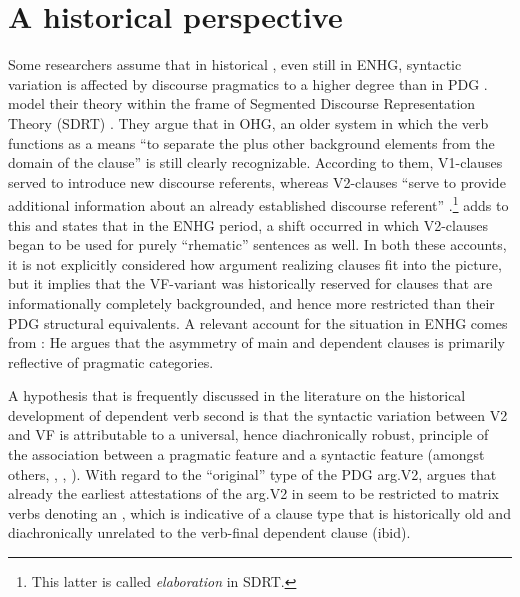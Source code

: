 \documentclass[output=paper,colorlinks,citecolor=brown]{langscibook}
\begin{document}
\section{A historical perspective}\label{sec:reetz:3}

Some researchers assume that in historical , even still in ENHG, syntactic variation is affected by discourse pragmatics to a higher degree than in PDG \citep{fleischmann1973,hinterholzl2010v1,speyer2010}. \citet{hinterholzl2010v1} model their theory within the frame of Segmented Discourse Representation Theory (SDRT) \citep{AsherLascarides2003}. They argue that in OHG, an older system in which the verb functions as a means “to separate the  plus other background elements from the  domain of the clause” \citep[5]{hinterholzl2010v1} is still clearly recognizable. According to them, V1-clauses served to introduce new discourse referents, whereas V2-clauses “serve to provide additional information about an already established discourse referent” \citep[2]{hinterholzl2010v1}.\footnote{This latter  is called \textit{elaboration} in SDRT.} \citet{speyer2010} adds to this and states that in the ENHG period, a shift occurred in which V2-clauses began to be used for purely “rhematic” sentences as well. In both these accounts, it is not explicitly considered how argument realizing clauses fit into the picture, but it implies that the VF-variant was historically reserved for clauses that are informationally completely backgrounded, and hence more restricted than their PDG structural equivalents. A relevant account for the situation in ENHG comes from \citet{fleischmann1973}: He argues that the asymmetry of main and dependent clauses is primarily reflective of pragmatic categories.

A hypothesis that is frequently discussed in the literature on the historical development of dependent verb second is that the syntactic variation between V2 and VF is attributable to a universal, hence diachronically robust, principle of the association between a pragmatic feature and a syntactic feature (amongst others, \citealt{Auer1998}, \citeauthor{Petrova2020a} \citeyear{Petrova2020b}, \citeyear{Petrova2020a}). With regard to the “original” type of the PDG arg.V2, \citet[187]{Axel2012} argues that already the earliest attestations of the arg.V2 in  seem to be restricted to matrix verbs denoting an , which is indicative of a clause type that is historically old and diachronically unrelated to the verb-final dependent clause (ibid).
\end{document}
